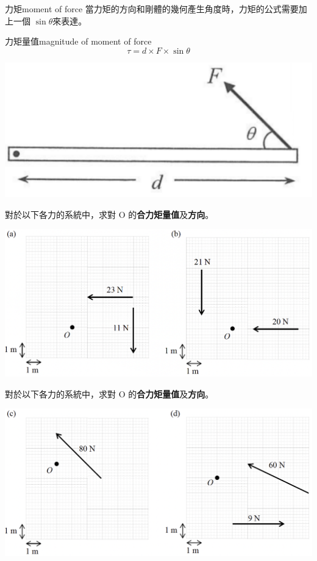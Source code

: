 \documentclass[beamer=true]{standalone}
\begin{document}
\begin{frame}{力矩moment of force}
    當力矩的方向和剛體的幾何產生角度時，力矩的公式需要加上一個 $\sin\theta$來表達。
    \begin{alertblock}
        {力矩量值magnitude of moment of force}
        \begin{equation}
            \tau = d\times F \times\sin \theta
        \end{equation}
    \end{alertblock}
    \bigskip
    {\par\centering
        \includegraphics[width=.4\textwidth]{assets/dfd826ba.png}
        \par}
\end{frame}

\begin{eg}
    對於以下各力的系統中，求對 O 的\textbf{合力矩量值}及\textbf{方向}。
    {\par\centering
    \includegraphics[width=\textwidth]{assets/a1fab181.png}
    \par}
\end{eg}
\begin{eg}
    對於以下各力的系統中，求對 O 的\textbf{合力矩量值}及\textbf{方向}。
    {\par\centering
    \includegraphics[width=\textwidth]{assets/d462b1fc.png}
    \par}
\end{eg}
\end{document}

